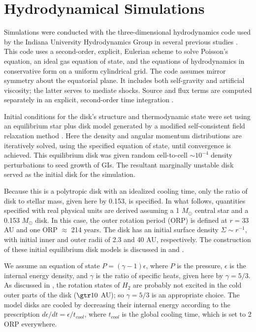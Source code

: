 \documentclass[manuscript]{aastex}
\begin{document}
\section{Hydrodynamical Simulations}

Simulations were conducted with the three-dimensional hydrodynamics code used by the Indiana University Hydrodynamics Group in several previous studies \citep{pickett1998, pickett2000, mejiaphd2004, mejia2005, boley2006, cai2008}.  This code uses a second-order, explicit, Eulerian scheme to solve Poisson's equation, an ideal gas equation of state, and the equations of hydrodynamics in conservative form on a uniform cylindrical grid.  The code assumes mirror symmetry about the equatorial plane. It includes both self-gravity and artificial viscosity; the latter serves to 
mediate shocks. Source and flux terms \citep{norman1986} are computed separately in an explicit, second-order time integration \citep{albada1982,christodoulou1991,yangphd1992}.

Initial conditions for the disk's structure and thermodynamic state were set using an equilibrium star plus disk model generated by a modified \citet{hachisu1986} self-consistent field relaxation method \citep{pickett1996,pickett2003,mejiaphd2004,mejia2005,cai2006}. Here  the density and angular momentum distributions are iteratively solved, using the specified equation of state,  until convergence is achieved. This  equilibrium disk was 
given random cell-to-cell $\sim10^{-4}$ density perturbations to seed growth of  GIs.  The resultant marginally unstable disk served as the initial disk for the simulation.

Because this is a polytropic disk with an idealized cooling time, only the ratio of disk to stellar mass, given here by
0.153, is specified.  In what follows, quantities specified with real physical units are derived assuming a 1 $M_\odot$
central star and a 0.153  $M_\odot$ disk. In this case, the outer rotation period (ORP) is defined at $r = 33$ AU and
one ORP $\approx$ 214 years.  The disk has an initial surface density $\Sigma \sim r^{ -1}$, with initial inner and
outer radii of 2.3 and 40 AU, respectively. The construction of these initial equilibrium disk models is discussed in
\citet{pickett2003} and \citet{mejia2005}.

 We assume an equation of state $P = (\gamma -1)\epsilon$, where $P$ is the pressure, $\epsilon$ is the internal energy
 density, and $\gamma$ is the ratio of specific heats, given here by $\gamma = 5/3$. As discussed in \citet{boley2007a},
 the rotation states of $H_2$ are probably not excited in the cold outer parts of the disk ($\gtr 10$ AU); so $\gamma =
 5/3$ is an appropriate choice. The model disks are cooled by decreasing their internal energy according to the prescription $d\epsilon/dt = \epsilon / t_{cool}$, where $t_{cool}$ is the global cooling time, which is set to 2 ORP everywhere. 
 
\end{document}
